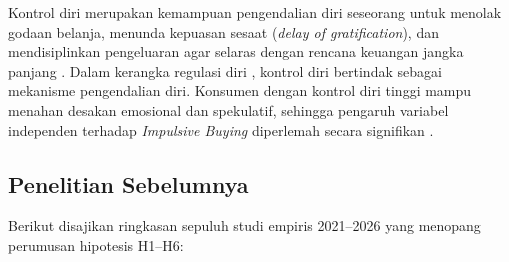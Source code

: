 \documentclass[12pt,a4paper]{article}
\numberwithin{equation}{section}
\numberwithin{table}{section}
\numberwithin{figure}{section}
\begin{document}
Kontrol diri merupakan kemampuan pengendalian diri seseorang untuk menolak godaan belanja, menunda kepuasan sesaat (\emph{delay of gratification}), dan mendisiplinkan pengeluaran agar selaras dengan rencana keuangan jangka panjang \citep{tangney2004high, baumeister2002yield, rafael2023intellectual, jain2023selfcontrol}. Dalam kerangka regulasi diri \citep{baumeister2024selfcontrol}, kontrol diri bertindak sebagai mekanisme pengendalian diri. Konsumen dengan kontrol diri tinggi mampu menahan desakan emosional dan spekulatif, sehingga pengaruh variabel independen terhadap \emph{Impulsive Buying} diperlemah secara signifikan \citep{prihatiningrum2021effect, jain2023selfcontrol}.

\subsection{Penelitian Sebelumnya}

Berikut disajikan ringkasan sepuluh studi empiris 2021--2026 yang menopang perumusan hipotesis H1--H6:
\end{document}

